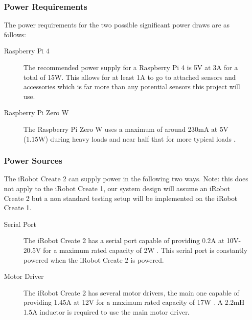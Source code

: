 \documentclass[12pt]{report}
\begin{document}
\subsubsection{Power Requirements}
The power requirements for the two possible significant power draws are as follows:
\begin{description}
    \item[Raspberry Pi 4] The recommended power supply for a Raspberry Pi 4 is 5V at 3A\cite{Pi4Specs} for a total of 15W. This allows for at least 1A to go to attached sensors and accessories which is far more than any potential sensors this project will use.
    \item[Raspberry Pi Zero W] The Raspberry Pi Zero W uses a maximum of around 230mA at 5V (1.15W) during heavy loads and near half that for more typical loads \cite{PiZeroPower}.
\end{description}

\subsubsection{Power Sources}
The iRobot Create 2 can supply power in the following two ways. Note: this does not apply to the iRobot Create 1, our system design will assume an iRobot Create 2 but a non standard testing setup will be implemented on the iRobot Create 1. 
\begin{description}
    \item[Serial Port] The iRobot Create 2 has a serial port capable of providing 0.2A at 10V-20.5V for a maximum rated capacity of 2W \cite{BatterySpecs}. This serial port is constantly powered when the iRobot Create 2 is powered. 
    \item[Motor Driver] The iRobot Create 2 has several motor drivers, the main one capable of providing 1.45A at 12V for a maximum rated capacity of 17W \cite{BatterySpecs}. A 2.2mH 1.5A inductor is required to use the main motor driver.
\end{description}
\end{document}
